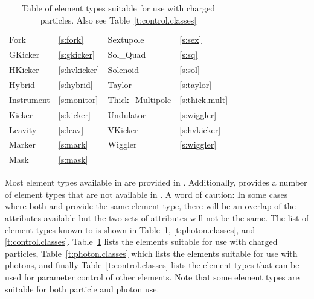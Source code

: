 \begin{table}[htb]
{\begin{tabular}{llll}
  Fork              & \ref{s:fork}          &  Sextupole         & \ref{s:sex}        \\
  GKicker           & \ref{s:gkicker}       &  Sol_Quad          & \ref{s:sq}         \\
  HKicker           & \ref{s:hvkicker}      &  Solenoid          & \ref{s:sol}        \\
  Hybrid            & \ref{s:hybrid}        &  Taylor            & \ref{s:taylor}     \\
  Instrument        & \ref{s:monitor}       &  Thick_Multipole   & \ref{s:thick.mult} \\
  Kicker            & \ref{s:kicker}        &  Undulator         & \ref{s:wiggler}    \\
  Lcavity           & \ref{s:lcav}          &  VKicker           & \ref{s:hvkicker}   \\ 
  Marker            & \ref{s:mark}          &  Wiggler           & \ref{s:wiggler}    \\
  Mask              & \ref{s:mask}          &                    &                    \\
  \bottomrule
\end{tabular}
} \caption{Table of element types suitable for use with charged particles. Also see
Table~\ref{t:control.classes}} \label{t:particle.classes}
\end{table}

Most element types available in \mad are provided in \bmad.  Additionally, \bmad provides a number
of element types that are not available in \mad.  A word of caution: In some cases where both \mad
and \bmad provide the same element type, there will be an overlap of the attributes available but
the two sets of attributes will not be the same.  The list of element types known to \bmad is shown
in Table~\ref{t:particle.classes}, \ref{t:photon.classes}, and \ref{t:control.classes}.
Table~\ref{t:particle.classes} lists the elements suitable for use with charged particles,
Table~\ref{t:photon.classes} which lists the elements suitable for use with photons, and finally
Table~\ref{t:control.classes} lists the  element types that can be used for parameter
control of other elements. Note that some element types are suitable for both particle and photon
use.

